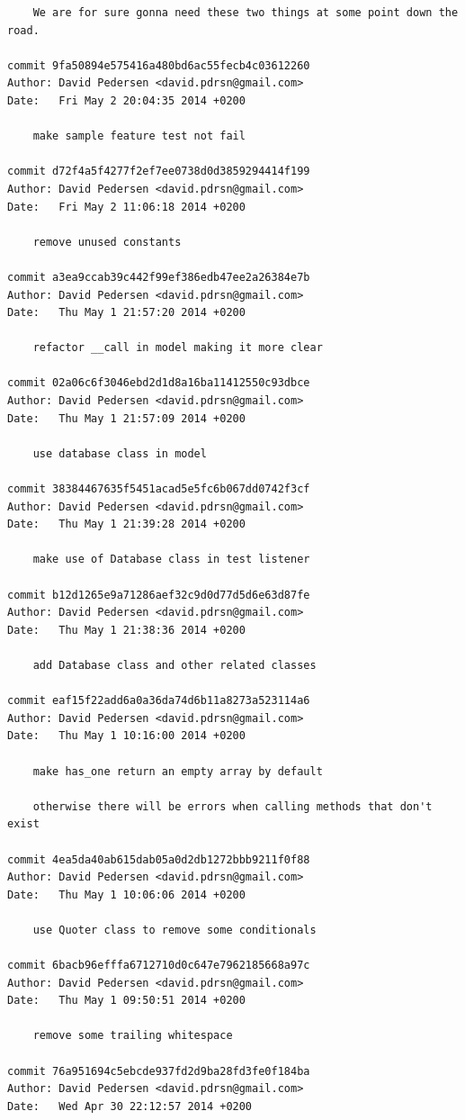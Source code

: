 \documentclass[12pt]{article}
\begin{document}
\begin{verbatim}
    We are for sure gonna need these two things at some point down the road.

commit 9fa50894e575416a480bd6ac55fecb4c03612260
Author: David Pedersen <david.pdrsn@gmail.com>
Date:   Fri May 2 20:04:35 2014 +0200

    make sample feature test not fail

commit d72f4a5f4277f2ef7ee0738d0d3859294414f199
Author: David Pedersen <david.pdrsn@gmail.com>
Date:   Fri May 2 11:06:18 2014 +0200

    remove unused constants

commit a3ea9ccab39c442f99ef386edb47ee2a26384e7b
Author: David Pedersen <david.pdrsn@gmail.com>
Date:   Thu May 1 21:57:20 2014 +0200

    refactor __call in model making it more clear

commit 02a06c6f3046ebd2d1d8a16ba11412550c93dbce
Author: David Pedersen <david.pdrsn@gmail.com>
Date:   Thu May 1 21:57:09 2014 +0200

    use database class in model

commit 38384467635f5451acad5e5fc6b067dd0742f3cf
Author: David Pedersen <david.pdrsn@gmail.com>
Date:   Thu May 1 21:39:28 2014 +0200

    make use of Database class in test listener

commit b12d1265e9a71286aef32c9d0d77d5d6e63d87fe
Author: David Pedersen <david.pdrsn@gmail.com>
Date:   Thu May 1 21:38:36 2014 +0200

    add Database class and other related classes

commit eaf15f22add6a0a36da74d6b11a8273a523114a6
Author: David Pedersen <david.pdrsn@gmail.com>
Date:   Thu May 1 10:16:00 2014 +0200

    make has_one return an empty array by default
    
    otherwise there will be errors when calling methods that don't exist

commit 4ea5da40ab615dab05a0d2db1272bbb9211f0f88
Author: David Pedersen <david.pdrsn@gmail.com>
Date:   Thu May 1 10:06:06 2014 +0200

    use Quoter class to remove some conditionals

commit 6bacb96efffa6712710d0c647e7962185668a97c
Author: David Pedersen <david.pdrsn@gmail.com>
Date:   Thu May 1 09:50:51 2014 +0200

    remove some trailing whitespace

commit 76a951694c5ebcde937fd2d9ba28fd3fe0f184ba
Author: David Pedersen <david.pdrsn@gmail.com>
Date:   Wed Apr 30 22:12:57 2014 +0200


\end{verbatim}
\end{document}
